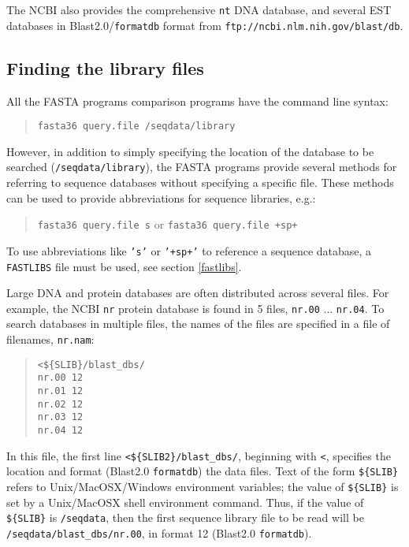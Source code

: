 \documentclass[11pt]{article}
\begin{document}
The NCBI also provides the comprehensive \texttt{nt} DNA database, and
several EST databases in Blast2.0/\texttt{formatdb} format from
\texttt{ftp://ncbi.nlm.nih.gov/blast/db}.


\subsection{Finding the library files}

All the FASTA programs comparison programs have the command line syntax:
\begin{quote}
\texttt{fasta36 query.file /seqdata/library}
\end{quote}
However, in addition to simply specifying the location of the database
to be searched
(\texttt{/seqdata/library}), the FASTA programs
provide several methods for referring to sequence databases without specifying a specific file.  These methods can be used to provide abbreviations for sequence libraries, e.g.:
\begin{quote}
\texttt{fasta36 query.file s} 
or
\texttt{fasta36 query.file +sp+}
\end{quote}
To use abbreviations like \texttt{'s'} or \texttt{'+sp+'} to reference a
sequence database, a \texttt{FASTLIBS} file must be used, see section
\ref{fastlibs}.

Large DNA and protein databases are often distributed across several
files.  For example, the NCBI \texttt{nr} protein database is found in
5 files, \texttt{nr.00} ... \texttt{nr.04}.  To search databases in
multiple files, the names of the files are specified in a file of
filenames, \texttt{nr.nam}:
\begin{quote}
\begin{verbatim}
<${SLIB}/blast_dbs/
nr.00 12
nr.01 12
nr.02 12
nr.03 12
nr.04 12
\end{verbatim}
\end{quote}
In this file, the first line \texttt{<\$\{SLIB2\}/blast\_dbs/},
beginning with \texttt{<}, specifies the location and format (Blast2.0
\texttt{formatdb}) the data files. Text of the form
\texttt{\$\{SLIB\}} refers to Unix/MacOSX/Windows environment
variables; the value of \texttt{\$\{SLIB\}} is set by a Unix/MacOSX
shell environment command. Thus, if the value of \texttt{\$\{SLIB\}}
is \texttt{/seqdata}, then the first sequence library file to be read
will be \texttt{/seqdata/blast\_dbs/nr.00}, in format 12 (Blast2.0
\texttt{formatdb}).
\end{document}
